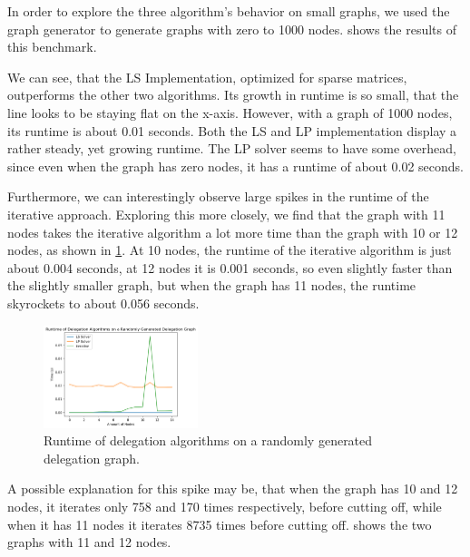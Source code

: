 In order to explore the three algorithm's behavior on small graphs, we used the graph generator to generate graphs with zero to 1000 nodes.  shows the results of this benchmark.

We can see, that the LS Implementation, optimized for sparse matrices, outperforms the other two algorithms. Its growth in runtime is so small, that the line looks to be staying flat on the x-axis. However, with a graph of 1000 nodes, its runtime is about 0.01 seconds. Both the LS and LP implementation display a rather steady, yet growing runtime. The LP solver seems to have some overhead, since even when the graph has zero nodes, it has a runtime of about 0.02 seconds.

Furthermore, we can interestingly observe large spikes in the runtime of the iterative approach. Exploring this more closely, we find that the graph with 11 nodes takes the iterative algorithm a lot more time than the graph with 10 or 12 nodes, as shown in \cref{fig:random-tiny}. At 10 nodes, the runtime of the iterative algorithm is just about 0.004 seconds, at 12 nodes it is 0.001 seconds, so even slightly faster than the slightly smaller graph, but when the graph has 11 nodes, the runtime skyrockets to about 0.056 seconds.

\begin{figure}[h]
    \centering
    \includegraphics[width=0.4\textwidth]{0-15_random}
    \caption{Runtime of delegation algorithms on a randomly generated delegation graph.}
    \label{fig:random-tiny}
\end{figure}

A possible explanation for this spike may be, that when the graph has 10 and 12 nodes, it iterates only 758 and 170 times respectively, before cutting off, while when it has 11 nodes it iterates 8735 times before cutting off.  shows the two graphs with 11 and 12 nodes.

